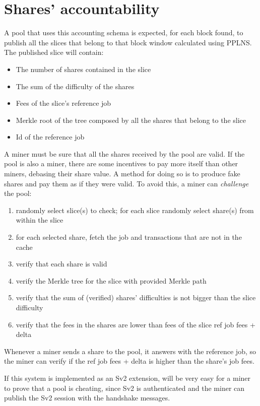 \documentclass[10pt]{article}
\begin{document}
\section{Shares' accountability}
A pool that uses this accounting schema is expected, for each block found, to publish all the slices that belong to that block window calculated using PPLNS. The published slice will contain:
\begin{itemize}
	\item The number of shares contained in the slice
	\item The sum of the difficulty of the shares
	\item Fees of the slice's reference job
	\item Merkle root of the tree composed by all the shares that belong to the slice
	\item Id of the reference job
\end{itemize}
A miner must be sure that all the shares received by the pool are valid. If the pool is also a miner, there are some incentives to pay more itself than other miners, debasing their share value. A method for doing so is to produce fake shares and pay them as if they were valid. To avoid this, a miner can \emph{challenge} the pool:
\begin{enumerate}
	\item randomly select slice(s) to check; for each slice randomly select share(s) from within the slice
	\item for each selected share, fetch the job and transactions that are not in the cache 
	\item verify that each share is valid
	\item verify the Merkle tree for the slice with provided Merkle path
	\item verify that the sum of (verified) shares' difficulties is not bigger than the slice difficulty
	\item verify that the fees in the shares are lower than fees of the slice ref job fees + delta
	
\end{enumerate}
 
Whenever a miner sends a share to the pool, it answers with the  reference job, so the miner can verify if the ref job fees + delta is higher than the share's job fees.

If this system is implemented as an Sv2 extension, will be very easy for a miner to prove that a pool is cheating, since Sv2 is authenticated and the miner can publish the Sv2 session with the handshake messages.
\end{document}
